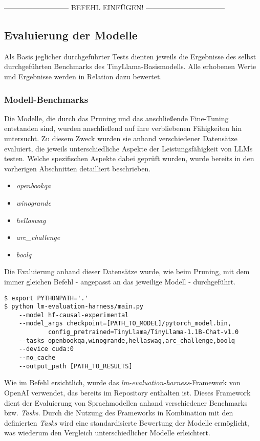 --------------------------- BEFEHL EINFÜGEN! ---------------------------------


\subsection{Evaluierung der Modelle}

Als Basis jeglicher durchgeführter Tests dienten jeweils die Ergebnisse des
selbst durchgeführten Benchmarks des TinyLlama-Basismodells. Alle erhobenen
Werte und Ergebnisse werden in Relation dazu bewertet.

\subsubsection{Modell-Benchmarks}

Die Modelle, die durch das Pruning und das anschließende Fine-Tuning entstanden
sind, wurden anschließend auf ihre verbliebenen Fähigkeiten hin untersucht. Zu
diesem Zweck wurden sie anhand verschiedener Datensätze evaluiert, die jeweils
unterschiedliche Aspekte der Leistungsfähigkeit von LLMs testen. Welche
spezifischen Aspekte dabei geprüft wurden, wurde bereits in den vorherigen
Abschnitten detailliert beschrieben.

\begin{itemize}
	\item{\emph{openbookqa}}
	\item{\emph{winogrande}}
	\item{\emph{hellaswag}}
	\item{\emph{arc\_challenge}}
	\item{\emph{boolq}}
\end{itemize}

Die Evaluierung anhand dieser Datensätze wurde, wie beim Pruning, mit dem immer
gleichen Befehl - angepasst an das jeweilige Modell - durchgeführt.

\vspace{1em}
\begin{lstlisting}
$ export PYTHONPATH='.'
$ python lm-evaluation-harness/main.py
    --model hf-causal-experimental
    --model_args checkpoint=[PATH_TO_MODEL]/pytorch_model.bin,
            config_pretrained=TinyLlama/TinyLlama-1.1B-Chat-v1.0
    --tasks openbookqa,winogrande,hellaswag,arc_challenge,boolq
    --device cuda:0
    --no_cache
    --output_path [PATH_TO_RESULTS]
\end{lstlisting}


Wie im Befehl ersichtlich, wurde das \emph{lm-evaluation-harness}-Framework von
OpenAI verwendet, das bereits im Repository enthalten ist. Dieses Framework
dient der Evaluierung von Sprachmodellen anhand verschiedener Benchmarks bzw.
\emph{Tasks}. Durch die Nutzung des Frameworks in Kombination mit den
definierten \emph{Tasks} wird eine standardisierte Bewertung der Modelle
ermöglicht, was wiederum den Vergleich unterschiedlicher Modelle erleichtert.

